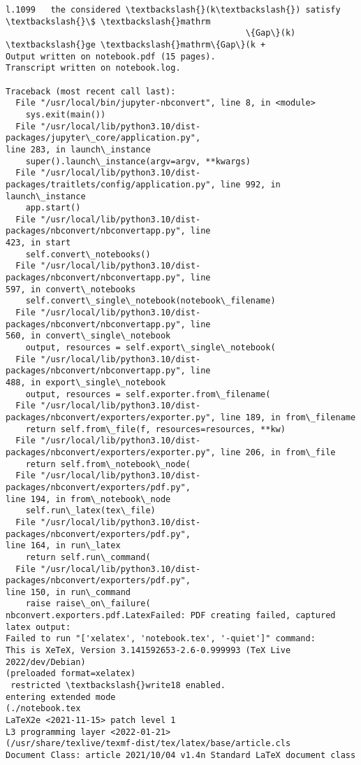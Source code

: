 \documentclass[11pt]{article}
\begin{document}
\begin{Verbatim}[commandchars=\\\{\}]
l.1099   the considered \textbackslash{}(k\textbackslash{}) satisfy \textbackslash{}\$ \textbackslash{}mathrm
                                                \{Gap\}(k) \textbackslash{}ge \textbackslash{}mathrm\{Gap\}(k +
Output written on notebook.pdf (15 pages).
Transcript written on notebook.log.

Traceback (most recent call last):
  File "/usr/local/bin/jupyter-nbconvert", line 8, in <module>
    sys.exit(main())
  File "/usr/local/lib/python3.10/dist-packages/jupyter\_core/application.py",
line 283, in launch\_instance
    super().launch\_instance(argv=argv, **kwargs)
  File "/usr/local/lib/python3.10/dist-
packages/traitlets/config/application.py", line 992, in launch\_instance
    app.start()
  File "/usr/local/lib/python3.10/dist-packages/nbconvert/nbconvertapp.py", line
423, in start
    self.convert\_notebooks()
  File "/usr/local/lib/python3.10/dist-packages/nbconvert/nbconvertapp.py", line
597, in convert\_notebooks
    self.convert\_single\_notebook(notebook\_filename)
  File "/usr/local/lib/python3.10/dist-packages/nbconvert/nbconvertapp.py", line
560, in convert\_single\_notebook
    output, resources = self.export\_single\_notebook(
  File "/usr/local/lib/python3.10/dist-packages/nbconvert/nbconvertapp.py", line
488, in export\_single\_notebook
    output, resources = self.exporter.from\_filename(
  File "/usr/local/lib/python3.10/dist-
packages/nbconvert/exporters/exporter.py", line 189, in from\_filename
    return self.from\_file(f, resources=resources, **kw)
  File "/usr/local/lib/python3.10/dist-
packages/nbconvert/exporters/exporter.py", line 206, in from\_file
    return self.from\_notebook\_node(
  File "/usr/local/lib/python3.10/dist-packages/nbconvert/exporters/pdf.py",
line 194, in from\_notebook\_node
    self.run\_latex(tex\_file)
  File "/usr/local/lib/python3.10/dist-packages/nbconvert/exporters/pdf.py",
line 164, in run\_latex
    return self.run\_command(
  File "/usr/local/lib/python3.10/dist-packages/nbconvert/exporters/pdf.py",
line 150, in run\_command
    raise raise\_on\_failure(
nbconvert.exporters.pdf.LatexFailed: PDF creating failed, captured latex output:
Failed to run "['xelatex', 'notebook.tex', '-quiet']" command:
This is XeTeX, Version 3.141592653-2.6-0.999993 (TeX Live 2022/dev/Debian)
(preloaded format=xelatex)
 restricted \textbackslash{}write18 enabled.
entering extended mode
(./notebook.tex
LaTeX2e <2021-11-15> patch level 1
L3 programming layer <2022-01-21>
(/usr/share/texlive/texmf-dist/tex/latex/base/article.cls
Document Class: article 2021/10/04 v1.4n Standard LaTeX document class

\end{Verbatim}
\end{document}
